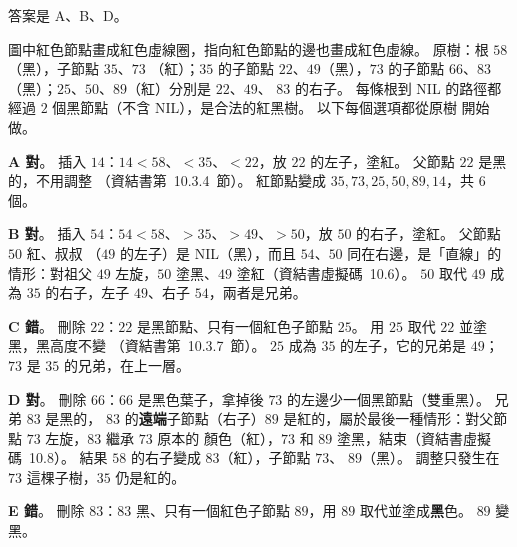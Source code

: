 \begin{pastsoln}
答案是 A、B、D。

圖中紅色節點畫成紅色虛線圈，指向紅色節點的邊也畫成紅色虛線。 原樹：根 $58$（黑），子節點 $35$、$73$
（紅）；$35$ 的子節點 $22$、$49$（黑），$73$ 的子節點 $66$、$83$（黑）；$25$、$50$、$89$（紅）分別是 $22$、$49$、
$83$ 的右子。 每條根到 NIL 的路徑都經過 $2$ 個黑節點（不含 NIL），是合法的紅黑樹。 以下每個選項都從原樹
開始做。

\textbf{A 對}。 插入 $14$：$14 < 58$、$< 35$、$< 22$，放 $22$ 的左子，塗紅。 父節點 $22$ 是黑的，不用調整
（資結書第~10.3.4~節）。 紅節點變成 $35, 73, 25, 50, 89, 14$，共 $6$ 個。

\textbf{B 對}。 插入 $54$：$54 < 58$、$> 35$、$> 49$、$> 50$，放 $50$ 的右子，塗紅。 父節點 $50$ 紅、叔叔
（$49$ 的左子）是 NIL（黑），而且 $54$、$50$ 同在右邊，是「直線」的情形：對祖父 $49$ 左旋，$50$ 塗黑、$49$
塗紅（資結書虛擬碼~10.6）。 $50$ 取代 $49$ 成為 $35$ 的右子，左子 $49$、右子 $54$，兩者是兄弟。

\textbf{C 錯}。 刪除 $22$：$22$ 是黑節點、只有一個紅色子節點 $25$。 用 $25$ 取代 $22$ 並塗黑，黑高度不變
（資結書第~10.3.7~節）。 $25$ 成為 $35$ 的左子，它的兄弟是 $49$；$73$ 是 $35$ 的兄弟，在上一層。

\textbf{D 對}。 刪除 $66$：$66$ 是黑色葉子，拿掉後 $73$ 的左邊少一個黑節點（雙重黑）。 兄弟 $83$ 是黑的，
$83$ 的\textbf{遠端}子節點（右子）$89$ 是紅的，屬於最後一種情形：對父節點 $73$ 左旋，$83$ 繼承 $73$ 原本的
顏色（紅），$73$ 和 $89$ 塗黑，結束（資結書虛擬碼~10.8）。 結果 $58$ 的右子變成 $83$（紅），子節點 $73$、
$89$（黑）。 調整只發生在 $73$ 這棵子樹，$35$ 仍是紅的。

\textbf{E 錯}。 刪除 $83$：$83$ 黑、只有一個紅色子節點 $89$，用 $89$ 取代並塗成\textbf{黑}色。 $89$ 變黑。
\end{pastsoln}

